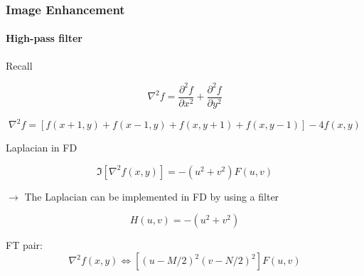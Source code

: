 \documentclass{beamer}
\begin{document}
\begin{frame}
\frametitle{Image Enhancement}
\framesubtitle{High-pass filter}
\begin{block}{Recall}
\begin{itemize}
\scriptsize{
	\item[] 	$$ \nabla ^2 f = \frac{\partial^2 f}{\partial x^2} + \frac{\partial^2 f}{\partial y^2}$$ 
	\item[] $$ \nabla ^2 f = \left[f(x+1,y)+f(x-1,y)+f(x,y+1)+f(x,y-1)\right]-4f(x,y)$$ 
	}
\end{itemize}
\end{block}
\begin{block}{Laplacian in FD}
\begin{itemize}
\scriptsize{
	\item[]$$ \Im [\nabla^2 f(x,y)] = -(u^2 +v^2)F(u,v) $$	
	\item[]$\rightarrow$ The Laplacian can be implemented in FD by using a filter 
	\item[] $$ H(u,v) = -(u^2 +v^2) $$ 
	\item FT pair: 
	$$ \nabla^2 f(x,y) \Leftrightarrow [(u-M/2)^2 (v-N/2)^2]F(u,v )$$
	}
\end{itemize}
\end{block}
\end{frame}
\end{document}
